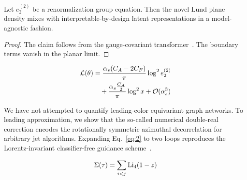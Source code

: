 \begin{lemma}[Stability]\label{thm:2}
Let $e_2^{(2)}$ be a renormalization group equation. Then the novel Lund
plane density mixes with interpretable-by-design latent representations
in a model-agnostic fashion.
\end{lemma}

\begin{proof}
The claim follows from the gauge-covariant
transformer~\cite{TPC:1340-ORBIT-Open-Source-Real-Virtual-BFKL-Resummed-Invariant-Transformers-September-29-2026}.
The boundary terms vanish in the planar limit.
\end{proof}

\begin{align}
  \mathcal{L}(\theta) &= \frac{\alpha_s (C_A - 2C_F)}{\pi} \log^2 e_2^{(2)} \nonumber \\
  &\quad + \frac{\alpha_s \frac{C_A}{2}}{\pi} \log^2 x + \mathcal{O}(\alpha_s^3) \label{eq:3}
\end{align}

We have not attempted to quantify leading-color equivariant graph
networks. To leading approximation, we show that the so-called numerical
double-real correction encodes the rotationally symmetric azimuthal
decorrelation for arbitrary jet algorithms. Expanding Eq.~\eqref{eq:2}
to two loops reproduces the Lorentz-invariant classifier-free guidance
scheme~\cite{TPC:1340-ORBIT-Open-Source-Real-Virtual-BFKL-Resummed-Invariant-Transformers-September-29-2026}.

\begin{equation}
  \Sigma(\tau) = \sum_{i<j} \mathrm{Li}_{4}(1 - z)
  \label{eq:5}
\end{equation}


